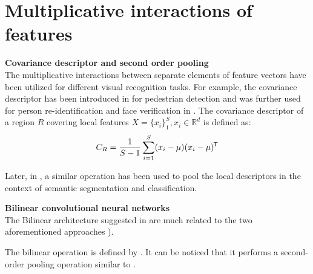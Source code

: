 



\section{Multiplicative interactions of features}

\bigskip\ident\textbf{Covariance descriptor and second order pooling}\\
The multiplicative interactions between separate elements of feature vectors have been utilized for different visual recognition tasks. For example, 
the covariance descriptor has been introduced in \citep{tuzel2008pedestrian} for pedestrian detection and was further used for person re-identification and face verification in \citep{ma2012bicov}. 
The covariance descriptor of a region $R$ covering local features $X = \{x_i\}_1^S, x_i \in \mathbb{R}^d$ is defined as:
\begin{equation}
   \label{eq:covariance}
    C_R =\frac{1}{S-1} \sum_{i=1}^{S}(x_i-\mu)(x_i-\mu)^{\mkern-1.5mu\mathsf{T}}
\end{equation}

Later, in  \citep{carreira2012semantic}, a similar operation has been used to pool the local descriptors in the context of semantic segmentation and classification.  %

\bigskip\ident\textbf{Bilinear convolutional neural networks}\\
The Bilinear architecture suggested in \citep{lin2015bilinear} are much related to the two aforementioned approaches \citep{tuzel2008pedestrian,carreira2012semantic}). 

The bilinear operation is defined by . It can be noticed that it performs a second-order pooling operation similar to .


